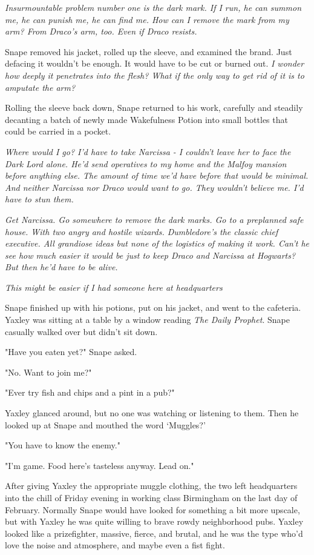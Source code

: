 \emph{Insurmountable problem number one is the dark mark. If I run, he can summon me, he can punish me, he can find me. How can I remove the mark from my arm? From Draco's arm, too. Even if Draco resists.}

Snape removed his jacket, rolled up the sleeve, and examined the brand. Just defacing it wouldn't be enough. It would have to be cut or burned out. \emph{I wonder how deeply it penetrates into the flesh? What if the only way to get rid of it is to amputate the arm?}

Rolling the sleeve back down, Snape returned to his work, carefully and steadily decanting a batch of newly made Wakefulness Potion into small bottles that could be carried in a pocket.

\emph{Where would I go? I'd have to take Narcissa - I couldn't leave her to face the Dark Lord alone. He'd send operatives to my home and the Malfoy mansion before anything else. The amount of time we'd have before that would be minimal. And neither Narcissa nor Draco would want to go. They wouldn't believe me. I'd have to stun them.}

\emph{Get Narcissa. Go somewhere to remove the dark marks. Go to a preplanned safe house. With two angry and hostile wizards. Dumbledore's the classic chief executive. All grandiose ideas but none of the logistics of making it work. Can't he see how much easier it would be just to keep Draco and Narcissa at Hogwarts? But then he'd have to be alive.}

\emph{This might be easier if I had someone here at headquarters{\el}}

Snape finished up with his potions, put on his jacket, and went to the cafeteria. Yaxley was sitting at a table by a window reading \emph{The Daily Prophet}. Snape casually walked over but didn't sit down.

"Have you eaten yet?" Snape asked.

"No. Want to join me?"

"Ever try fish and chips and a pint in a pub?"

Yaxley glanced around, but no one was watching or listening to them. Then he looked up at Snape and mouthed the word `Muggles?'

"You have to know the enemy."

"I'm game. Food here's tasteless anyway. Lead on."

After giving Yaxley the appropriate muggle clothing, the two left headquarters into the chill of Friday evening in working class Birmingham on the last day of February. Normally Snape would have looked for something a bit more upscale, but with Yaxley he was quite willing to brave rowdy neighborhood pubs. Yaxley looked like a prizefighter, massive, fierce, and brutal, and he was the type who'd love the noise and atmosphere, and maybe even a fist fight.

